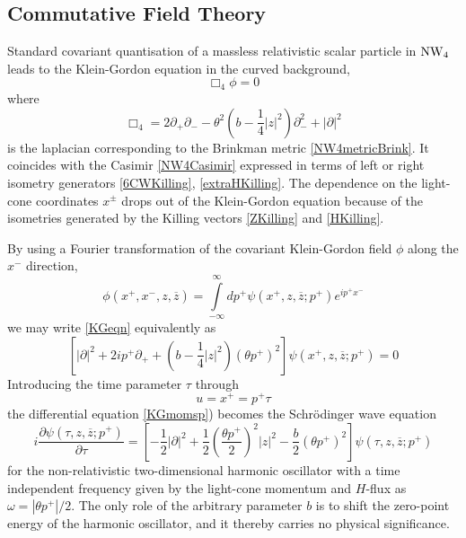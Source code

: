\subsection{Commutative Field Theory}
\label{Dynamics}
Standard covariant quantisation of a massless relativistic scalar particle in
$\operatorname{NW}_4$ leads to the Klein-Gordon equation in the curved background,
\begin{equation}
  \label{KGeqn}
  \Box_4\phi = 0  
\end{equation}
where
\begin{equation}
  \label{BoxNW4def}
  \Box_4=2 \partial_+ \partial_--\theta^2 
  \left(b-\frac14  |z|^2\right) \partial_-^2+|\partial|^2
\end{equation}
is the laplacian corresponding to the Brinkman metric \eqref{NW4metricBrink}. It
coincides with the Casimir \eqref{NW4Casimir} expressed in terms of left or
right isometry generators \eqref{6CWKilling}, \eqref{extraHKilling}. The
dependence on the light-cone coordinates $x^\pm$ drops out of the Klein-Gordon
equation because of the isometries generated by the Killing vectors
\eqref{ZKilling} and \eqref{HKilling}.

By using a Fourier transformation of the covariant Klein-Gordon field
$\phi$ along the $x^-$ direction,
\begin{equation}
  \label{KGphiFT}
  \phi\left(x^+,x^-,z,\overline{z} \right)=\int\limits_{-\infty}^\infty
  d p^+ \psi\left(x^+,z,\overline{z};p^+\right) e^{ i  p^+x^-}  
\end{equation}
we may write \eqref{KGeqn} equivalently as
\begin{equation}
  \label{KGmomsp}
  \left[|\partial|^2+2 i  p^+ \partial_++\left(b-
      \frac14  |z|^2\right) \left(\theta p^+\right)^2\right]\psi\left(x^+,z,
    \overline{z};p^+\right)=0  
\end{equation}
Introducing the time parameter $\tau$ through
\begin{equation}
  \label{utaudef}
  u=x^+=p^+ \tau  
\end{equation}
the differential equation \eqref{KGmomsp}) becomes the
Schr\"odinger wave equation
\begin{equation}
  \label{SchHO}
  i  \frac{\partial\psi\left(\tau,z,\overline{z};p^+\right)}{\partial\tau}=
  \left[-\frac12  |\partial|^2+\frac12  \left(
      \frac{\theta p^+}2 \right)^2 
    |z|^2-\frac b2  \left(\theta p^+\right)^2\right]\psi\left(\tau,z,
    \overline{z};p^+\right)
\end{equation}
for the non-relativistic two-dimensional harmonic oscillator with a time
independent frequency given by the light-cone momentum and $H$-flux as
$\omega=|\theta p^+|/2$. The only role of the arbitrary parameter $b$ is to shift
the zero-point energy of the harmonic oscillator, and it thereby carries no
physical significance.

